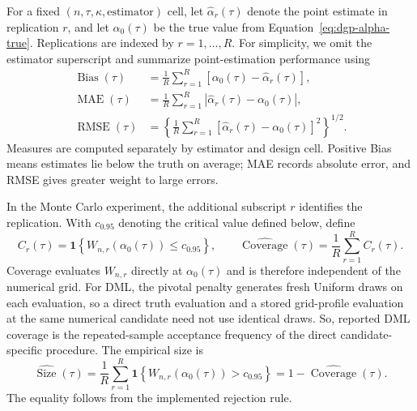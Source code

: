 For a fixed $(n,\tau,\kappa,\text{estimator})$ cell, let $\widehat{\alpha}_r(\tau)$ denote the point estimate in replication $r$, and let $\alpha_0(\tau)$ be the true value from Equation~\eqref{eq:dgp-alpha-true}. Replications are indexed by $r=1,\ldots,R$. For simplicity, we omit the estimator superscript and summarize point-estimation performance using
\begin{equation}
  \begin{aligned}
    \operatorname{Bias}(\tau)
      &=\frac{1}{R}\sum_{r=1}^{R}\left[\alpha_0(\tau)-\widehat{\alpha}_r(\tau)\right], \\
    \operatorname{MAE}(\tau)
      &=\frac{1}{R}\sum_{r=1}^{R}\left|\widehat{\alpha}_r(\tau)-\alpha_0(\tau)\right|, \\
    \operatorname{RMSE}(\tau)
      &=\left\{\frac{1}{R}\sum_{r=1}^{R}\left[\widehat{\alpha}_r(\tau)-\alpha_0(\tau)\right]^2\right\}^{1/2}.
  \end{aligned}
  \label{eq:performance-point}
\end{equation}
Measures are computed separately by estimator and design cell. Positive Bias means estimates lie below the truth on average; MAE records absolute error, and RMSE gives greater weight to large errors.

In the Monte Carlo experiment, the additional subscript $r$ identifies the replication. With $c_{0.95}$ denoting the critical value defined below, define
\begin{equation}
  C_r(\tau)
    =\mathbf{1}\!\left\{W_{n,r}\!\left(\alpha_0(\tau)\right)\leq c_{0.95}\right\},
  \qquad
  \widehat{\operatorname{Coverage}}(\tau)
    =\frac{1}{R}\sum_{r=1}^{R}C_r(\tau).
  \label{eq:performance-coverage}
\end{equation}
Coverage evaluates $W_{n,r}$ directly at $\alpha_0(\tau)$ and is therefore independent of the numerical grid. For DML, the pivotal penalty generates fresh Uniform draws on each evaluation, so a direct truth evaluation and a stored grid-profile evaluation at the same numerical candidate need not use identical draws. So, reported DML coverage is the repeated-sample acceptance frequency of the direct candidate-specific procedure. The empirical size is
\begin{equation}
  \widehat{\operatorname{Size}}(\tau)
    =\frac{1}{R}\sum_{r=1}^{R}
      \mathbf{1}\!\left\{W_{n,r}\!\left(\alpha_0(\tau)\right)>c_{0.95}\right\}
    =1-\widehat{\operatorname{Coverage}}(\tau).
  \label{eq:performance-size}
\end{equation}
The equality follows from the implemented rejection rule.

